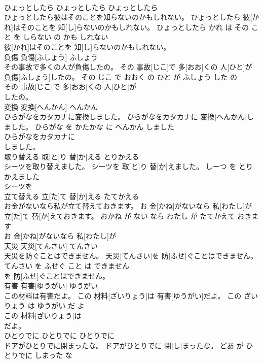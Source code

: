 \documentclass[8pt]{extreport}
\begin{document}
\begin{CJK}{UTF8}{min}
\\	ひょっとしたら	ひょっとしたら	ひょっとしたら	
\\	ひょっとしたら彼はそのことを知らないのかもしれない。	ひょっとしたら 彼[かれ]はそのことを 知[し]らないのかもしれない。	ひょっとしたら かれ は その こと を しらない の かも しれない	
\\	彼[かれ]はそのことを 知[し]らないのかもしれない。			
\\	負傷	負傷[ふしょう]	ふしょう	
\\	その事故で多くの人が負傷したの。	その 事故[じこ]で 多[おお]くの 人[ひと]が 負傷[ふしょう]したの。	その じこ で おおく の ひと が ふしょう した の	
\\	その 事故[じこ]で 多[おお]くの 人[ひと]が
\\	したの。			
\\	変換	変換[へんかん]	へんかん	
\\	ひらがなをカタカナに変換しました。	ひらがなをカタカナに 変換[へんかん]しました。	ひらがな を かたかな に へんかん しました	
\\	ひらがなをカタカナに
\\	しました。			
\\	取り替える	取[と]り 替[か]える	とりかえる	
\\	シーツを取り替えました。	シーツを 取[と]り 替[か]えました。	しーつ を とりかえました	
\\	シーツを
\\	立て替える	立[た]て 替[か]える	たてかえる	
\\	お金がないなら私が立て替えておきます。	お 金[かね]がないなら 私[わたし]が 立[た]て 替[か]えておきます。	おかね が ない なら わたし が たてかえて おきます	
\\	お 金[かね]がないなら 私[わたし]が
\\	天災	天災[てんさい]	てんさい	
\\	天災を防ぐことはできません。	天災[てんさい]を 防[ふせ]ぐことはできません。	てんさい を ふせぐ こと は できません	
\\	を 防[ふせ]ぐことはできません。			
\\	有害	有害[ゆうがい]	ゆうがい	
\\	この材料は有害だよ。	この 材料[ざいりょう]は 有害[ゆうがい]だよ。	この ざいりょう は ゆうがい だ よ	
\\	この 材料[ざいりょう]は
\\	だよ。			
\\	ひとりでに	ひとりでに	ひとりでに	
\\	ドアがひとりでに閉まったな。	ドアがひとりでに 閉[し]まったな。	どあ が ひとりでに しまった な	

\end{CJK}
\end{document}
